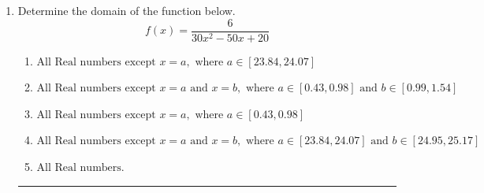 \documentclass[14pt]{extbook}
\newcommand{\litem}[1]{\item#1\hspace*{-1cm}\rule{\textwidth}{0.4pt}}
\begin{document}
\begin{enumerate}
{\begin{enumerate}[label=\Alph*.]
\end{enumerate} }
\litem{
Determine the domain of the function below.\[ f(x) = \frac{6}{30x^{2} -50 x + 20} \]\begin{enumerate}[label=\Alph*.]
\item \( \text{All Real numbers except } x = a, \text{ where } a \in [23.84, 24.07] \)
\item \( \text{All Real numbers except } x = a \text{ and } x = b, \text{ where } a \in [0.43, 0.98] \text{ and } b \in [0.99, 1.54] \)
\item \( \text{All Real numbers except } x = a, \text{ where } a \in [0.43, 0.98] \)
\item \( \text{All Real numbers except } x = a \text{ and } x = b, \text{ where } a \in [23.84, 24.07] \text{ and } b \in [24.95, 25.17] \)
\item \( \text{All Real numbers.} \)


\end{enumerate}}
\end{enumerate}
\end{document}
